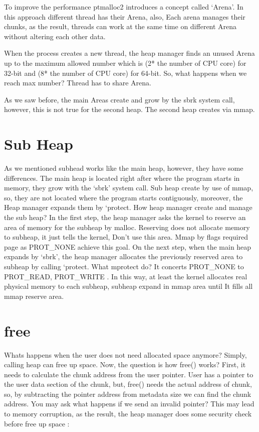 \documentclass{masterthesis}
\begin{document}
To improve the performance ptmalloc2 introduces a concept called ‘Arena’. In this approach different thread has their Arena, also, Each arena manages their chunks, as the result, threads can work at the same time on different Arena without altering each other data.

When the process creates a new thread, the heap manager finds an unused Arena up to the maximum allowed number which is (2* the number of CPU core) for 32-bit and (8* the number of CPU core) for 64-bit. So, what happens when we reach max number? Thread has to share Arena.

As we saw before, the main Areas create and grow by the sbrk system call, however, this is not true for the second heap. The second heap creates via mmap.

\section{Sub Heap}
As we mentioned subhead works like the main heap, however, they have some differences. The main heap is located right after where the program starts in memory, they grow with the ‘sbrk’ system call. Sub heap create by use of mmap, so, they are not located where the program starts contiguously, moreover, the Heap manager expands them by ‘protect.
How heap manager create and manage the sub heap? In the first step, the heap manager asks the kernel to reserve an area of memory for the subheap by malloc. Reserving does not allocate memory to subheap, it just tells the kernel, Don’t use this area. Mmap by flags required page as PROT\_NONE achieve this goal.
On the next step, when the main heap expands by ‘sbrk’, the heap manager allocates the previously reserved area to subheap by calling ‘protect. What mprotect do? It concerts PROT\_NONE to PROT\_READ, PROT\_WRITE . In this way, at least the kernel allocates real physical memory to each subheap, subheap expand in mmap area until It fills all mmap reserve area.

\section{free}
Whats happens when the user does not need allocated space anymore? Simply, calling heap can free up space. Now, the question is how free() works? First, it needs to calculate the chunk address from the user pointer. User has a pointer to the user data section of the chunk, but, free() needs the actual address of chunk, so, by subtracting the pointer address from metadata size we can find the chunk address. You may ask what happens if we send an invalid pointer? This may lead to memory corruption, as the result, the heap manager does some security check before free up space :
\end{document}
